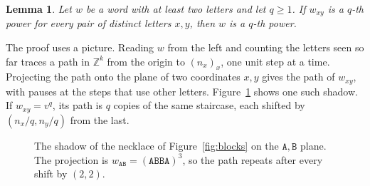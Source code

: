 \documentclass[11pt,a4paper]{article}
\newtheorem{lemma}{Lemma}
\theoremstyle{remark}
\begin{document}
\begin{lemma}\label{lem:pairs}
Let $w$ be a word with at least two letters and let $q\ge1$. If $w_{xy}$
is a $q$-th power for every pair of distinct letters $x,y$, then $w$ is a
$q$-th power.
\end{lemma}

The proof uses a picture. Reading $w$ from the left and counting the
letters seen so far traces a path in $\mathbb{Z}^k$ from the origin to
$(n_x)_x$, one unit step at a time. Projecting the path onto the plane
of two coordinates $x,y$ gives the path of $w_{xy}$, with pauses at the
steps that use other letters. Figure~\ref{fig:shadow} shows one such
shadow. If $w_{xy}=v^q$, its path is $q$ copies of the same staircase,
each shifted by $(n_x/q,n_y/q)$ from the last.

\begin{figure}[ht]
\centering
{}
\caption{The shadow of the necklace of Figure~\ref{fig:blocks} on the
$\mathtt{A},\mathtt{B}$ plane. The projection is
$w_{\mathtt{AB}}=(\mathtt{ABBA})^3$, so the path repeats after every
shift by $(2,2)$.}\label{fig:shadow}
\end{figure}
\end{document}
